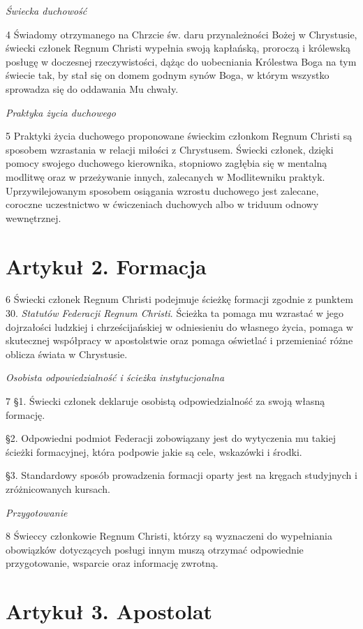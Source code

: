 ﻿\documentclass{report}
\newcommand{\lett}[1]{\lettrine[findent=6pt]{#1}{}}
\newcommand{\ssec}[1]{\vspace{1em}\textit{#1}\vspace{.5em}\nopagebreak}
\begin{document}
\ssec{Świecka duchowość}


\lett{4}{} Świadomy otrzymanego na Chrzcie św. daru przynależności Bożej w Chrystusie, świecki członek Regnum Christi wypełnia swoją kapłańską, proroczą i królewską posługę w doczesnej rzeczywistości, dążąc do uobecniania Królestwa Boga na tym świecie tak, by stał się on domem godnym synów Boga, w którym wszystko sprowadza się do oddawania Mu chwały.
 
\ssec{Praktyka życia duchowego}
 
\lett{5} Praktyki życia duchowego proponowane świeckim członkom Regnum Christi są sposobem wzrastania w relacji miłości z Chrystusem. Świecki członek, dzięki pomocy swojego duchowego kierownika, stopniowo zagłębia się w mentalną modlitwę oraz w przeżywanie innych, zalecanych w Modlitewniku praktyk. Uprzywilejowanym sposobem osiągania wzrostu duchowego jest zalecane, coroczne uczestnictwo w ćwiczeniach duchowych albo w triduum odnowy wewnętrznej.


\section{Artykuł 2. Formacja}


\lett{6} Świecki członek Regnum Christi podejmuje ścieżkę formacji zgodnie z punktem 30. {\em Statutów Federacji Regnum Christi}. Ścieżka ta pomaga mu wzrastać w jego dojrzałości ludzkiej i chrześcijańskiej w odniesieniu do własnego życia, pomaga w skutecznej współpracy w apostolstwie oraz pomaga oświetlać i przemieniać różne oblicza świata w Chrystusie.
 
\ssec{Osobista odpowiedzialność i ścieżka instytucjonalna}


\lett{7} \S{}1. Świecki członek deklaruje osobistą odpowiedzialność za swoją własną formację.


\S{}2. Odpowiedni podmiot Federacji zobowiązany jest do wytyczenia mu takiej ścieżki formacyjnej, która podpowie jakie są cele, wskazówki i środki.


\S{}3. Standardowy sposób prowadzenia formacji oparty jest na kręgach studyjnych i zróżnicowanych kursach.
 
\ssec{Przygotowanie}


\lett{8} Świeccy członkowie Regnum Christi, którzy są wyznaczeni do wypełniania obowiązków dotyczących posługi innym muszą otrzymać odpowiednie przygotowanie, wsparcie oraz informację zwrotną.


\section{Artykuł 3. Apostolat}
\end{document}

